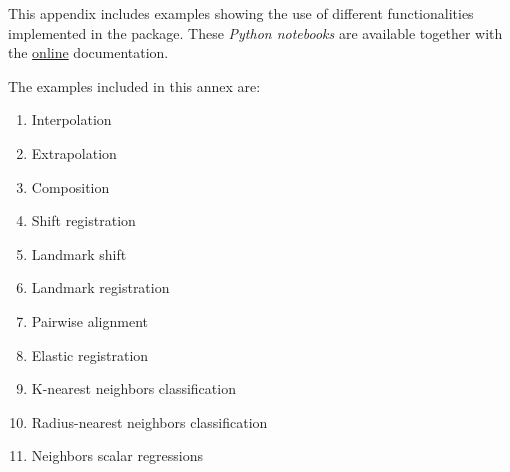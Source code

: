 

This appendix includes examples showing the use of different functionalities
implemented in the package. These \textit{Python notebooks} are available
together with the 
\href{https://fda.readthedocs.io/en/latest/auto_examples/}{online} documentation.

The examples included in this annex are:

\begin{enumerate}
\item Interpolation
\item Extrapolation
\item Composition
\item Shift registration
\item Landmark shift
\item Landmark registration
\item Pairwise alignment
\item Elastic registration
\item K-nearest neighbors classification
\item Radius-nearest neighbors classification
\item Neighbors scalar regressions

\end{enumerate}












